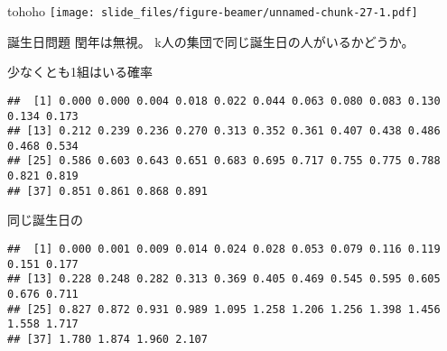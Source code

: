 \documentclass[
  ignorenonframetext,
]{beamer}
\begin{document}
\begin{frame}[fragile]{tohoho}
\protect\hypertarget{tohoho-1}{}
\texttt{[image: slide\_files/figure-beamer/unnamed-chunk-27-1.pdf]}

\begin{block}{誕生日問題}
\protect\hypertarget{ux8a95ux751fux65e5ux554fux984c}{}
閏年は無視。 k人の集団で同じ誕生日の人がいるかどうか。

\begin{block}{少なくとも1組はいる確率}
\protect\hypertarget{ux5c11ux306aux304fux3068ux30821ux7d44ux306fux3044ux308bux78baux7387}{}
\begin{verbatim}
##  [1] 0.000 0.000 0.004 0.018 0.022 0.044 0.063 0.080 0.083 0.130 0.134 0.173
## [13] 0.212 0.239 0.236 0.270 0.313 0.352 0.361 0.407 0.438 0.486 0.468 0.534
## [25] 0.586 0.603 0.643 0.651 0.683 0.695 0.717 0.755 0.775 0.788 0.821 0.819
## [37] 0.851 0.861 0.868 0.891
\end{verbatim}
\end{block}

\begin{block}{同じ誕生日の}
\protect\hypertarget{ux540cux3058ux8a95ux751fux65e5ux306e}{}
\begin{verbatim}
##  [1] 0.000 0.001 0.009 0.014 0.024 0.028 0.053 0.079 0.116 0.119 0.151 0.177
## [13] 0.228 0.248 0.282 0.313 0.369 0.405 0.469 0.545 0.595 0.605 0.676 0.711
## [25] 0.827 0.872 0.931 0.989 1.095 1.258 1.206 1.256 1.398 1.456 1.558 1.717
## [37] 1.780 1.874 1.960 2.107
\end{verbatim}
\end{block}
\end{block}
\end{frame}
\end{document}
